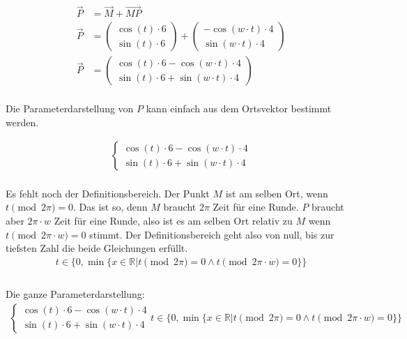 \documentclass[12pt, a4paper, twoside]{article}
\begin{document}
\begin{align*}
  \overrightarrow{P} & = \overrightarrow{M} + \overrightarrow{MP}               \\
  \overrightarrow{P} & = \begin{pmatrix}
    \cos(t) \cdot 6
    \\
    \sin(t) \cdot 6
  \end{pmatrix} + \begin{pmatrix}
    -\cos(w\cdot t) \cdot 4
    \\
    \sin(w\cdot t) \cdot 4
  \end{pmatrix} \\
  \overrightarrow{P} & = \begin{pmatrix}
    \cos(t)\cdot 6 - \cos(w\cdot t)\cdot 4
    \\
    \sin(t)\cdot 6 + \sin(w\cdot t)\cdot 4
  \end{pmatrix}
\end{align*}
\\

Die Parameterdarstellung von $P$ kann einfach aus dem Ortsvektor bestimmt werden.

\begin{align*}
  \begin{cases}
    \cos(t)\cdot 6 - \cos(w\cdot t)\cdot 4
    \\
    \sin(t)\cdot 6 + \sin(w\cdot t)\cdot 4
  \end{cases}
\end{align*}
\\

Es fehlt noch der Definitionsbereich.
Der Punkt $M$ ist am selben Ort, wenn $t\pmod{2\pi} = 0$.
Das ist so, denn $M$ braucht $2\pi$ Zeit für eine Runde.
$P$ braucht aber $2\pi \cdot w$ Zeit für eine Runde, also ist es am selben Ort relativ zu $M$ wenn $t\pmod{2\pi \cdot w} = 0$ stimmt.
Der Definitionsbereich geht also von null, bis zur tiefsten Zahl die beide Gleichungen erfüllt.\\
\begin{align*}
  t \in \{0, \min\{x\in\mathbb{R} | t\pmod{2\pi} = 0 \land t\pmod{2\pi \cdot w} = 0\}\} \\
\end{align*}
\\

Die ganze Parameterdarstellung:
\begin{align*}
  \begin{cases}
    \cos(t)\cdot 6 - \cos(w\cdot t)\cdot 4
    \\
    \sin(t)\cdot 6 + \sin(w\cdot t)\cdot 4
  \end{cases}t \in \{0, \min\{x\in\mathbb{R} | t\pmod{2\pi} = 0 \land t\pmod{2\pi \cdot w} = 0\}\} \\
\end{align*}
\\
\end{document}
